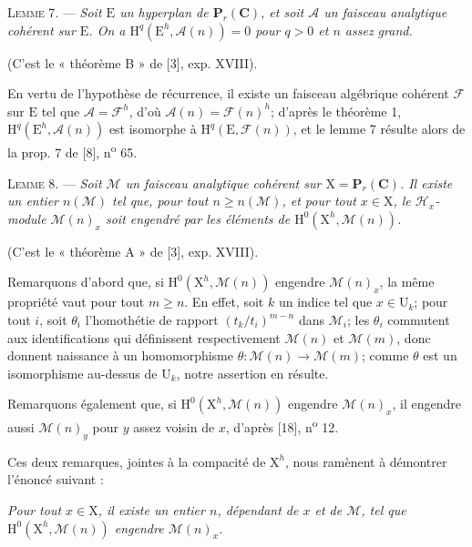 \textsc{Lemme 7}. --- \textit{Soit $\mathrm{E}$ un hyperplan de $\mathbf{P}_r(\mathbf{C})$, et soit $\mathcal{A}$ un faisceau analytique cohérent sur $\mathrm{E}$. On a $\mathrm{H}^q(\mathrm{E}^h, \mathcal{A}(n)) = 0$ pour $q > 0$ et $n$ assez grand.}

(C'est le « théorème B » de [3], exp. XVIII).

En vertu de l'hypothèse de récurrence, il existe un faisceau algébrique cohérent $\mathcal{F}$ sur $\mathrm{E}$ tel que $\mathcal{A} = \mathcal{F}^h$, d'où $\mathcal{A}(n) = \mathcal{F}(n)^h$; d'après le théorème 1, $\mathrm{H}^q(\mathrm{E}^h, \mathcal{A}(n))$ est isomorphe à $\mathrm{H}^q(\mathrm{E}, \mathcal{F}(n))$, et le lemme 7 résulte alors de la prop. 7 de [8], n\textsuperscript{o} 65.

\textsc{Lemme 8}. --- \textit{Soit $\mathcal{M}$ un faisceau analytique cohérent sur $\mathrm{X} = \mathbf{P}_r(\mathbf{C})$. Il existe un entier $n(\mathcal{M})$ tel que, pour tout $n \geqslant n(\mathcal{M})$, et pour tout $x \in \mathrm{X}$, le $\mathcal{H}_x$-module $\mathcal{M}(n)_x$ soit engendré par les éléments de $\mathrm{H}^0(\mathrm{X}^h, \mathcal{M}(n))$.}

(C'est le « théorème A » de [3], exp. XVIII).



Remarquons d'abord que, si $\mathrm{H}^0(\mathrm{X}^h, \mathcal{M}(n))$ engendre $\mathcal{M}(n)_x$, la même propriété vaut pour tout $m \geqslant n$. En effet, soit $k$ un indice tel que $x \in \mathrm{U}_k$; pour tout $i$, soit $\theta_i$ l'homothétie de rapport $(t_k/t_i)^{m-n}$ dans $\mathcal{M}_i$; les $\theta_i$ commutent aux identifications qui définissent respectivement $\mathcal{M}(n)$ et $\mathcal{M}(m)$, donc donnent naissance à un homomorphisme $\theta : \mathcal{M}(n) \to \mathcal{M}(m)$; comme $\theta$ est un isomorphisme au-dessus de $\mathrm{U}_k$, notre assertion en résulte.

Remarquons également que, si $\mathrm{H}^0(\mathrm{X}^h, \mathcal{M}(n))$ engendre $\mathcal{M}(n)_x$, il engendre aussi $\mathcal{M}(n)_y$ pour $y$ assez voisin de $x$, d'après [18], n\textsuperscript{o} 12.

Ces deux remarques, jointes à la compacité de $\mathrm{X}^h$, nous ramènent à démontrer l'énoncé suivant :

\textit{Pour tout $x \in \mathrm{X}$, il existe un entier $n$, dépendant de $x$ et de $\mathcal{M}$, tel que $\mathrm{H}^0(\mathrm{X}^h, \mathcal{M}(n))$ engendre $\mathcal{M}(n)_x$.}

